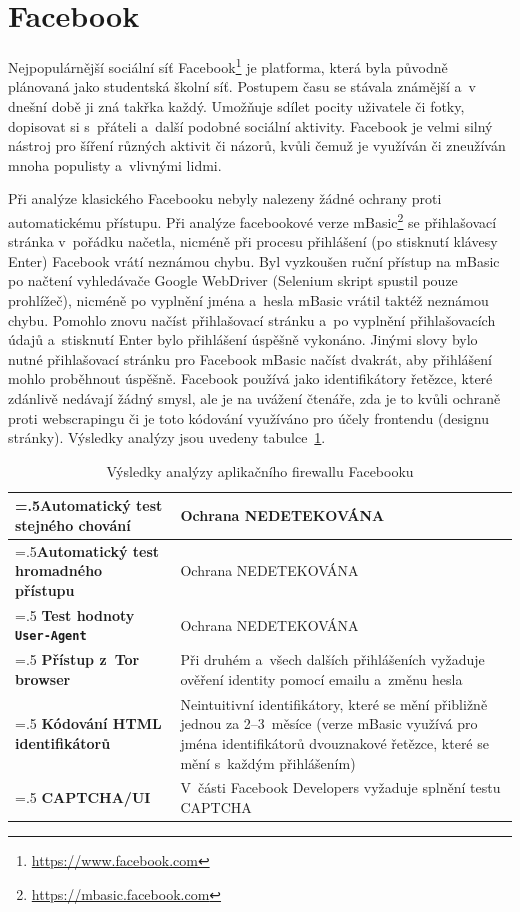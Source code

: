 \section{Facebook}
Nejpopulárnější sociální síť Facebook\footnote{\href{https://www.facebook.com}{https://www.facebook.com}} je platforma, která byla původně plánovaná jako studentská školní síť. Postupem času se stávala známější a~v dnešní době ji zná takřka každý. Umožňuje sdílet pocity uživatele či fotky, dopisovat si s~přáteli a~další podobné sociální aktivity. Facebook je velmi silný nástroj pro šíření různých aktivit či názorů, kvůli čemuž je využíván či zneužíván mnoha populisty a~vlivnými lidmi.

Při analýze klasického Facebooku nebyly nalezeny žádné ochrany proti automatickému přístupu. Při analýze facebookové verze mBasic\footnote{\href{https://mbasic.facebook.com}{https://mbasic.facebook.com}} se přihlašovací stránka v~pořádku načetla, nicméně při procesu přihlášení (po stisknutí klávesy Enter) Facebook vrátí neznámou chybu. Byl vyzkoušen ruční přístup na mBasic po načtení vyhledávače Google WebDriver (Selenium skript spustil pouze prohlížeč), nicméně po vyplnění jména a~hesla mBasic vrátil taktéž neznámou chybu. Pomohlo znovu načíst přihlašovací stránku a~po vyplnění přihlašovacích údajů a~stisknutí Enter bylo přihlášení úspěšně vykonáno. Jinými slovy bylo nutné přihlašovací stránku pro Facebook mBasic načíst dvakrát, aby přihlášení mohlo proběhnout úspěšně. Facebook používá jako identifikátory řetězce, které zdánlivě nedávají žádný smysl, ale je na uvážení čtenáře, zda je to kvůli ochraně proti webscrapingu či je toto kódování využíváno pro účely frontendu (designu stránky). Výsledky analýzy jsou uvedeny tabulce~\ref{tab:FB_analyse}.

\begin{table}[H]
\begin{tabularx}{\linewidth}{
  |>{\raggedright\arraybackslash\hsize=.5\hsize}X|>{\hsize=1.5\hsize}X|
  }
\hline
\textbf{Automatický test stejného chování} & Ochrana NEDETEKOVÁNA \\
\hline
\textbf{Automatický test hromadného přístupu} & Ochrana NEDETEKOVÁNA \\
\hline
\textbf{Test hodnoty \texttt{User-Agent}} & Ochrana NEDETEKOVÁNA \\
\hline
\textbf{Přístup z~Tor browser} & Při druhém a~všech dalších přihlášeních vyžaduje ověření identity pomocí emailu a~změnu hesla \\
\hline
\textbf{Kódování HTML identifikátorů} & Neintuitivní identifikátory, které se mění přibližně jednou za 2--3~měsíce (verze mBasic využívá pro jména identifikátorů dvouznakové řetězce, které se mění s~každým přihlášením)\\
\hline
\textbf{CAPTCHA/UI} & V~části Facebook Developers vyžaduje splnění testu CAPTCHA \\
\hline
\end{tabularx}

\caption{Výsledky analýzy aplikačního firewallu Facebooku}
\label{tab:FB_analyse}
\end{table}

